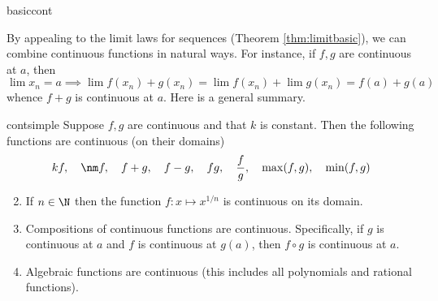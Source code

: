 \begin{examples}{}{basiccont}
\begin{enumerate}
  
\end{enumerate}
\end{examples}


By appealing to the limit laws for sequences (Theorem \ref{thm:limitbasic}), we can combine continuous functions in natural ways. For instance, if $f,g$ are continuous at $a$, then
\[\lim x_n=a\implies \lim f(x_n)+g(x_n)=\lim f(x_n)+\lim g(x_n)=f(a)+g(a)\]
whence $f+g$ is continuous at $a$. Here is a general summary.

\begin{thm}{}{contsimple}
\exstart Suppose $f,g$ are continuous and that $k$ is constant. Then the following functions are continuous (on their domains)
	\[kf,\quad \nm f,\quad f+g,\quad f-g,\quad fg,\quad \frac fg,\quad \max(f,g),\quad \min(f,g)\]
\begin{enumerate}\setcounter{enumi}{1}
	\item If $n\in\N$ then the function $f:x\mapsto x^{1/n}$ is continuous on its domain.
	\item Compositions of continuous functions are continuous. Specifically, if $g$ is continuous at $a$ and $f$ is continuous at $g(a)$, then $f\circ g$ is continuous at $a$.
	\item Algebraic functions are continuous (this includes all polynomials and rational functions).
\end{enumerate}
\end{thm}

